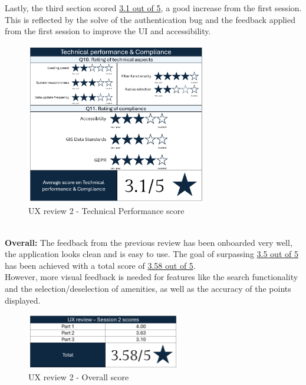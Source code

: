 \newpage
\noindent Lastly, the third section scored \underline{3.1 out of 5}, a good increase from the first session. This is reflected by the solve of the authentication bug and the feedback applied from the first session to improve the UI and accessibility.
\begin{figure}[h!]
    \centering
    \includegraphics[width=0.7\textwidth]{images/ux-survey2-technical.png}
    \caption{UX review 2 - Technical Performance score}
\end{figure}\\
\textbf{Overall: }
The feedback from the previous review has been onboarded very well, the application looks clean and is easy to use. The goal of surpassing \underline{3.5 out of 5} has been achieved with a total score of \underline{3.58 out of 5}.\\ However, more visual feedback is needed for features like the search functionality and the selection/deselection of amenities, as well as the accuracy of the points displayed.
\begin{figure}[h!]
    \centering
    \includegraphics[width=0.6\textwidth]{images/ux-survey2-summary.png}
    \caption{UX review 2 - Overall score}
\end{figure}\\